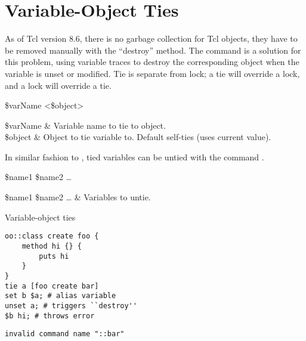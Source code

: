 \documentclass{article}
\renewcommand{\^}[1]{\textsuperscript{#1}}
\renewcommand{\_}[1]{\textsubscript{#1}}
\begin{document}
\clearpage

\section{Variable-Object Ties}
As of Tcl version 8.6, there is no garbage collection for Tcl objects, they have to be removed manually with the ``destroy'' method. 
The command  is a solution for this problem, using variable traces to destroy the corresponding object when the variable is unset or modified. 
Tie is separate from lock; a tie will override a lock, and a lock will override a tie.
\begin{syntax}
 \$varName <\$object>
\end{syntax}
\begin{args}
\$varName & Variable name to tie to object. \\
\$object & Object to tie variable to. Default self-ties (uses current value).
\end{args}

In similar fashion to , tied variables can be untied with the command .

\begin{syntax}
 \$name1 \$name2 …
\end{syntax}
\begin{args}
\$name1 \$name2 … & Variables to untie.
\end{args}

\begin{example}{Variable-object ties}
\begin{lstlisting}
oo::class create foo {
    method hi {} {
        puts hi
    }
}
tie a [foo create bar]
set b $a; # alias variable
unset a; # triggers ``destroy''
$b hi; # throws error
\end{lstlisting}
\tcblower
\begin{lstlisting}
invalid command name "::bar"
\end{lstlisting}
\end{example}
\end{document}

